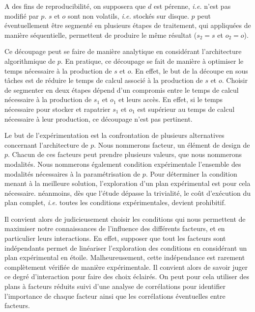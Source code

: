 A des fins de reproducibilité, on supposera que $d$ est pérenne, \textit{i.e.} n'est pas modifié par $p$. $s$ et $o$ sont non volatils, \textit{i.e.} stockés sur disque. $p$ peut éventuellement être segmenté en plusieurs étapes de traitement, qui appliquées de manière séquentielle, permettent de produire le même résultat ($s_2=s$ et $o_2=o$).



Ce découpage peut se faire de manière analytique en considérant l'architecture algorithmique de $p$. En pratique, ce découpage se fait de manière à optimiser le temps nécessaire à la production de $s$ et $o$. En effet, le but de la découpe en sous tâches est de réduire le temps de calcul associé à la production de $s$ et $o$. Choisir de segmenter en deux étapes dépend d'un compromis entre le temps de calcul nécessaire à la production de $s_1$ et $o_1$ et leurs accès. En effet, si le temps nécessaire pour stocker et rapatrier $s_1$ et $o_1$ est supérieur au temps de calcul nécessaire à leur production, ce découpage n'est pas pertinent.

Le but de l'expérimentation est la confrontation de plusieurs alternatives concernant l'architecture de $p$. Nous nommerons \textsf
{facteur}, un élément de design de $p$. Chacun de ces facteurs peut prendre plusieurs valeurs, que nous nommerons \textsf
{modalités}. Nous nommerons également \textsf
{condition expérimentale} l'ensemble des modalités nécessaires à la  paramétrisation de $p$. Pour déterminer la condition menant à la meilleure solution, l'exploration d'un plan expérimental est pour cela nécessaire. néanmoins, dès que l'étude dépasse la trivialité, le coût d'exécution du plan complet, \textit{i.e.} toutes les conditions expérimentales, devient prohibitif.

Il convient alors de judicieusement choisir les conditions qui nous permettent de maximiser notre connaissances de l'influence des différents facteurs, et en particulier leurs interactions. En effet, supposer que tout les facteurs sont indépendants permet de linéariser l'exploration des conditions en considérant un plan expérimental en étoile. Malheureusement, cette indépendance est rarement complètement vérifiée de manière expérimentale. Il convient alors de savoir juger ce degré d'interaction pour faire des choix éclairés. On peut pour cela utiliser des plans à facteurs réduits suivi d'une analyse de corrélations pour identifier l'importance de chaque facteur ainsi que les corrélations éventuelles entre facteurs.

